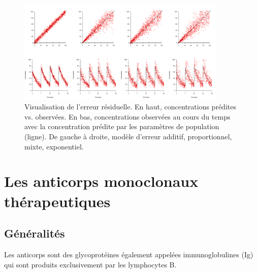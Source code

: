 \begin{figure}[htbp]
	\centering
		\includegraphics[width=10cm]{figures/raster/FIG_10}
	\caption[Visualisation de l'erreur résiduelle.]{Visualisation de l'erreur résiduelle. En haut, concentrations prédites vs. observées. En bas, concentrations observées au cours du temps avec la concentration prédite par les paramètres de population (ligne). De gauche à droite, modèle d'erreur additif, proportionnel, mixte, exponentiel.}
	\label{fig:10}
\end{figure}

\section{Les anticorps monoclonaux thérapeutiques}
\subsection{Généralités}
Les anticorps sont des glycoprotéines également appelées immunoglobulines (Ig) qui sont produits exclusivement par les lymphocytes B.

